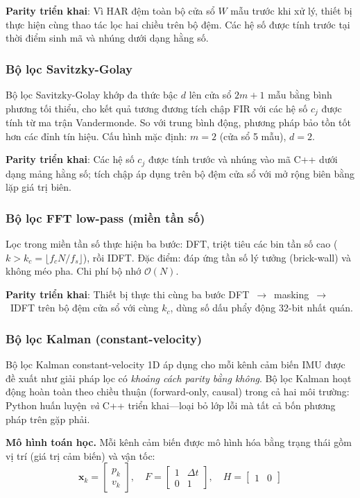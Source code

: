 \textbf{Parity triển khai}: Vì HAR đệm toàn bộ cửa sổ $W$ mẫu trước khi xử lý, thiết bị thực hiện cùng thao tác lọc hai chiều trên bộ đệm. Các hệ số được tính trước tại thời điểm sinh mã và nhúng dưới dạng hằng số.

\subsubsection{Bộ lọc Savitzky-Golay}
Bộ lọc Savitzky-Golay \cite{savitzky1964smoothing} khớp đa thức bậc $d$ lên cửa sổ $2m+1$ mẫu bằng bình phương tối thiểu, cho kết quả tương đương tích chập FIR với các hệ số $c_j$ được tính từ ma trận Vandermonde. So với trung bình động, phương pháp bảo tồn tốt hơn các đỉnh tín hiệu. Cấu hình mặc định: $m=2$ (cửa sổ 5 mẫu), $d=2$.

\textbf{Parity triển khai}: Các hệ số $c_j$ được tính trước và nhúng vào mã C++ dưới dạng mảng hằng số; tích chập áp dụng trên bộ đệm cửa sổ với mở rộng biên bằng lặp giá trị biên.

\subsubsection{Bộ lọc FFT low-pass (miền tần số)}
Lọc trong miền tần số thực hiện ba bước: DFT, triệt tiêu các bin tần số cao ($k > k_c = \lfloor f_c N / f_s \rfloor$), rồi IDFT. Đặc điểm: đáp ứng tần số lý tưởng (brick-wall) và không méo pha. Chi phí bộ nhớ $\mathcal{O}(N)$.

\textbf{Parity triển khai}: Thiết bị thực thi cùng ba bước DFT~$\to$~masking~$\to$~IDFT trên bộ đệm cửa sổ với cùng $k_c$, dùng số dấu phẩy động 32-bit nhất quán.

\subsubsection{Bộ lọc Kalman (constant-velocity)}
\label{sec:kalman_filter}

Bộ lọc Kalman constant-velocity 1D \cite{kalman1960new} áp dụng cho mỗi kênh cảm biến IMU được đề xuất như giải pháp lọc có \textit{khoảng cách parity bằng không}. Bộ lọc Kalman hoạt động hoàn toàn theo chiều thuận (forward-only, causal) trong cả hai môi trường: Python huấn luyện \textit{và} C++ triển khai---loại bỏ lớp lỗi mà tất cả bốn phương pháp trên gặp phải.

\textbf{Mô hình toán học.} Mỗi kênh cảm biến được mô hình hóa bằng trạng thái gồm vị trí (giá trị cảm biến) và vận tốc:
$$\mathbf{x}_k = \begin{bmatrix} p_k \\ v_k \end{bmatrix}, \quad
F = \begin{bmatrix} 1 & \Delta t \\ 0 & 1 \end{bmatrix}, \quad
H = \begin{bmatrix} 1 & 0 \end{bmatrix}$$

